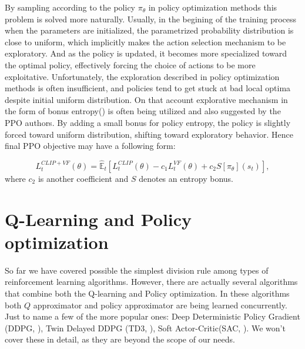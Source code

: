 By sampling according to the policy $\pi_\theta$ in policy optimization methods this problem is solved more naturally.
Usually, in the begining of the training process when the parameters are initialized, the parametrized probability distribution is close to uniform, which implicitly makes the action selection mechanism to be exploratory.
And as the policy is updated, it becomes more specialized toward the optimal policy, effectively forcing the choice of actions to be more exploitative.
Unfortunately, the exploration described in policy optimization methods is often insufficient, and policies tend to get stuck at bad local optima despite initial uniform distribution.
On that account explorative mechanism in the form of bonus entropy(\cite{EntropyRegularization}) is often being utilized and also suggested by the PPO authors.
By adding a small bonus for policy entropy, the policy is slightly forced toward uniform distribution, shifting toward exploratory behavior.
Hence final PPO objective may have a following form:

\[
  L_t^{CLIP+VF}(\theta) =   \hat{\mathbb{E}}_t \left[L_t^{CLIP}(\theta) - c_1 L_t^{VF}(\theta)  + c_2S[\pi_\theta](s_t)\right],
\]
where $c_2$ is another coefficient and $S$ denotes an entropy bonus.


\section*{Q-Learning and Policy optimization}
So far we have covered possible the simplest division rule among types of reinforcement learning algorithms.
However, there are actually several algorithms that combine both the Q-learning and Policy optimization.
In these algorithms both $Q$ approximator and policy approximator are being learned concurrently.
Just to name a few of the more popular ones: Deep Deterministic Policy Gradient (DDPG, \cite{DDPG}), Twin Delayed DDPG (TD3, \cite{TD3}), Soft Actor-Critic(SAC, \cite{SAC}).
We won't cover these in detail, as they are beyond the scope of our needs.




